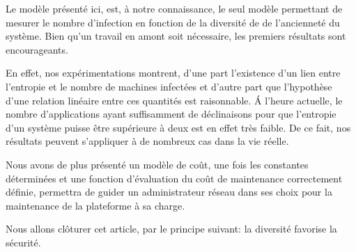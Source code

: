 Le modèle présenté ici, est, à notre connaissance, le seul modèle permettant de mesurer le nombre d'infection en fonction de la
diversité de de l'ancienneté du système. Bien qu'un travail en amont soit nécessaire, les premiers résultats sont encourageants. 
\newline

En effet, nos expérimentations montrent, d'une part l'existence d'un lien entre l'entropie et le nombre de machines infectées et d'autre part que l'hypothèse d'une
relation linéaire entre ces quantités est raisonnable. \'A l'heure actuelle, le nombre d'applications ayant suffisamment de
déclinaisons pour que l'entropie d'un système puisse être supérieure à deux est en effet très faible. De ce fait, nos résultats
peuvent s'appliquer à de nombreux cas dans la vie réelle. 
\newline

Nous avons de plus présenté un modèle de coût, une fois les constantes déterminées et une fonction d'évaluation du coût de
maintenance  correctement définie, permettra de guider un administrateur réseau dans ses choix pour la maintenance de la
plateforme à sa charge.
\newline

Nous allons clôturer cet article, par le principe suivant: la diversité favorise la sécurité.
